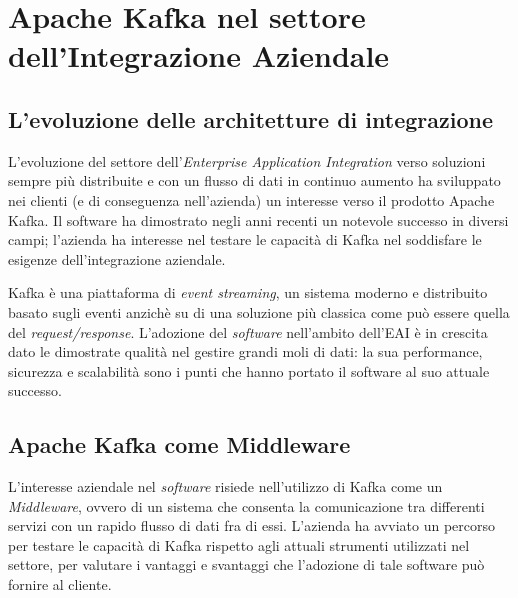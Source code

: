 \chapter{Apache Kafka nel settore dell’Integrazione Aziendale}

\section{L’evoluzione delle architetture di integrazione}

L'evoluzione del settore dell'\textit{Enterprise Application Integration} verso soluzioni sempre più distribuite e con un flusso di dati in continuo aumento ha sviluppato nei clienti (e di conseguenza nell'azienda) un interesse verso il prodotto Apache Kafka.
Il software ha dimostrato negli anni recenti un notevole successo in diversi campi; l'azienda ha interesse nel testare le capacità di Kafka nel soddisfare le esigenze dell'integrazione aziendale.

Kafka è una piattaforma di \textit{event streaming}, un sistema moderno e distribuito basato sugli eventi anzichè su di una soluzione più classica come può essere quella del \textit{request/response}.
L'adozione del \textit{software} nell'ambito dell'EAI è in crescita dato le dimostrate qualità nel gestire grandi moli di dati: la sua performance, sicurezza e scalabilità sono i punti che hanno portato il software al suo attuale successo.



\section{Apache Kafka come Middleware}

L'interesse aziendale nel \textit{software} risiede nell'utilizzo di Kafka come un  \textit{Middleware}, ovvero di un sistema che consenta la comunicazione tra differenti servizi con un rapido flusso di dati fra di essi.
L'azienda ha avviato un percorso per testare le capacità di Kafka rispetto agli attuali strumenti utilizzati nel settore, per valutare i vantaggi e svantaggi che l'adozione di tale software può fornire al cliente.

